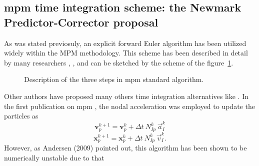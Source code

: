 \documentclass[preprint,12pt,a4paper]{elsarticle}
\newcommand{\vect}[1]{
  \ensuremath{\mathbf{{#1}}}
}
\begin{document}
\subsection{\acrshort{mpm} time integration scheme: the Newmark Predictor-Corrector proposal}
\label{sec:epc-algor-mpm}

As was stated previosuly, an explicit forward Euler algorithm has been utilized widely within the \acrshort{MPM} methodology. This scheme has been described in detail by many researchers
\cite{Sulsky1994}, \cite{Bardenhagen2002}, \cite{thesis_Andersen_2009} and can be sketched by the scheme of the figure~\ref{fig:MPM_algorithm}.
\begin{figure}\sidecaption
  \centering
  \caption{Description of the three steps in \acrshort{mpm} standard algorithm.}
  \label{fig:MPM_algorithm}
\end{figure}
Other authors have proposed many others time integration alternatives
like \cite{Guilkey_2003,Charlton_2017,Tran2019e}. In the
first publication on \acrshort{mpm} \cite{Sulsky1994}, the nodal acceleration
was employed to update the particles as
\begin{equation}
  \label{eq:Sulsky-1994-UL-v}
  \vect{v}_p^{k+1} = \vect{v}_p^{k} + \Delta t\ N_{Ip}^{k}\ \vec{a}_{I}^{k}
\end{equation}
\begin{equation}
  \label{eq:Sulsky-1994-UL-x}
  \vect{x}_p^{k+1} = \vect{x}_p^{k} + \Delta t\ N_{Ip}^{k}\ \vec{v}_{I}^{k}.
\end{equation}
However, as Andersen (2009)\cite{thesis_Andersen_2009} pointed out, this algorithm has been shown to be numerically unstable due to that
\end{document}
